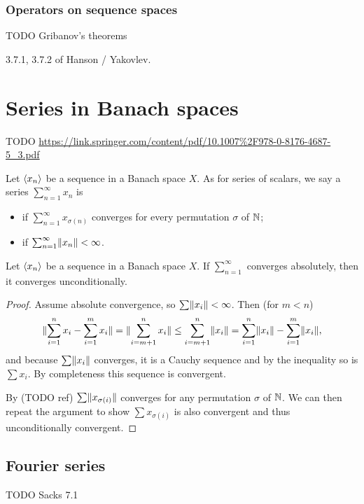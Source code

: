 \subsubsection{Operators on sequence spaces}
TODO Gribanov's theorems

3.7.1, 3.7.2 of Hanson / Yakovlev.

\section{Series in Banach spaces}
TODO
\url{https://link.springer.com/content/pdf/10.1007%2F978-0-8176-4687-5_3.pdf}
\begin{definition}
Let $\left\langle x_n \right\rangle$ be a sequence in a Banach space $X$. As for series of scalars, we say a series $\sum_{n=1}^\infty x_n$ is
\begin{itemize}
\item {} if $\sum_{n=1}^\infty x_{\sigma(n)}$ converges for every permutation $\sigma$ of $\mathbb{N}$;
\item {} if $\sum_{n=1}^\infty \lVert x_n\rVert < \infty$.
\end{itemize}
\end{definition}

\begin{proposition} \label{absoluteUnconditionalConvergenceBanach}
Let $\left\langle x_n \right\rangle$ be a sequence in a Banach space $X$. If $\sum_{n=1}^\infty$ converges absolutely, then it converges unconditionally.
\end{proposition}
\begin{proof}
Assume absolute convergence, so $\sum\lVert x_i\rVert<\infty$. Then (for $m< n$)
\[ \lVert\sum_{i=1}^n x_i - \sum_{i=1}^m x_i\rVert = \lVert\sum_{i=m+1}^n x_i\rVert \leq \sum_{i=m+1}^n\lVert x_i\rVert = \sum_{i=1}^n \lVert x_i\rVert - \sum_{i=1}^m \lVert x_i\rVert, \]
and because $\sum\lVert x_i\rVert$ converges, it is a Cauchy sequence and by the inequality so is $\sum x_i$. By completeness this sequence is convergent.

By (TODO ref) $\sum\lVert x_{\sigma(i)}\rVert$ converges for any permutation $\sigma$ of $\mathbb{N}$. We can then repeat the argument to show $\sum x_{\sigma(i)}$ is also convergent and thus unconditionally convergent.
\end{proof}

\subsection{Fourier series}
TODO Sacks 7.1

